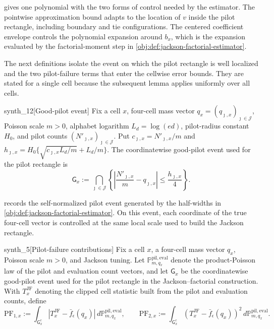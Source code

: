  gives one polynomial with the two forms of control needed by the estimator. The pointwise approximation bound adapts to the location of \(v\) inside the pilot rectangle, including boundary and tie configurations. The centered coefficient envelope controls the polynomial expansion around \(b_x\), which is the expansion evaluated by the factorial-moment step in \cref{obj:def:jackson-factorial-estimator}.

The next definitions isolate the event on which the pilot rectangle is well localized and the two pilot-failure terms that enter the cellwise error bounds. They are stated for a single cell because the subsequent lemma applies uniformly over all cells.

\begin{definitionv}{synth_12}[Good-pilot event]
Fix a cell \(x\), four-cell mass vector \(q_x=(q_{\jmath,x})_{\jmath\in\mathcal J}\), Poisson scale \(m>0\), alphabet logarithm \(L_d=\log(ed)\), pilot-radius constant \(H_0\), and pilot counts \((N'_{\jmath,x})_{\jmath\in\mathcal J}\). Put \(c_{\jmath,x}=N'_{\jmath,x}/m\) and \(h_{\jmath,x}=H_0\{\sqrt{c_{\jmath,x}L_d/m}+L_d/m\}\). The coordinatewise good-pilot event used for the pilot rectangle is \[\mathsf G_x:=\bigcap_{\jmath\in\mathcal J}\left\{\left|\frac{N'_{\jmath,x}}{m}-q_{\jmath,x}\right|\le \frac{h_{\jmath,x}}{4}\right\}.\]
\end{definitionv}

 records the self-normalized pilot event generated by the half-widths in \cref{obj:def:jackson-factorial-estimator}. On this event, each coordinate of the true four-cell vector is controlled at the same local scale used to build the Jackson rectangle.

\begin{definitionv}{synth_5}[Pilot-failure contributions]
Fix a cell \(x\), a four-cell mass vector \(q_x\), Poisson scale \(m>0\), and Jackson tuning. Let \(\mathbb P_{m,q_x}^{\mathrm{pil,eval}}\) denote the product-Poisson law of the pilot and evaluation count vectors, and let \(\mathsf G_x\) be the coordinatewise good-pilot event used for the pilot rectangle in the Jackson--factorial construction. With \(T_x^{\mathrm{JF}}\) denoting the clipped cell statistic built from the pilot and evaluation counts, define \[ \mathrm{PF}_{1,x}:=\int_{\mathsf G_x^c}\left|T_x^{\mathrm{JF}}-\bar f_\epsilon(q_x)\right|\,d\mathbb P_{m,q_x}^{\mathrm{pil,eval}}, \qquad \mathrm{PF}_{2,x}:=\int_{\mathsf G_x^c}\left(T_x^{\mathrm{JF}}-\bar f_\epsilon(q_x)\right)^2\,d\mathbb P_{m,q_x}^{\mathrm{pil,eval}}. \]
\end{definitionv}

